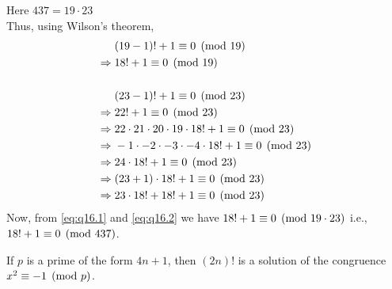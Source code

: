 \documentclass[12pt]{book}
\begin{document}
\begin{soln}
    Here $ 437=19\cdot 23 $\\
    Thus, using Wilson's theorem,
    \begin{align}
        &(19-1)!+1\equiv 0\pmod{19}\notag\\
        \Rightarrow\;&18!+1\equiv 0 \pmod{19}\label{eq:q16.1}\\
        &\notag\\
        &(23-1)!+1\equiv 0 \pmod{23}\notag\\
        \Rightarrow\;&22!+1\equiv 0 \pmod{23}\notag\\
        \Rightarrow\;&22\cdot21\cdot20\cdot19\cdot18!+1\equiv 0 \pmod{23}\notag\\
        \Rightarrow\;&-1\cdot -2\cdot -3\cdot -4\cdot 18!+1\equiv 0 \pmod{23}\notag\\
        \Rightarrow\;&24\cdot 18!+1\equiv 0 \pmod{23}\notag\\
        \Rightarrow\;&(23+1)\cdot 18!+1\equiv 0 \pmod{23}\notag\\
        \Rightarrow\;&23\cdot18! +18!+1\equiv 0 \pmod{23}\label{eq:q16.2}
    \end{align}
    Now, from \eqref{eq:q16.1} and \eqref{eq:q16.2} we have $ 18!+1\equiv 0 \pmod{19\cdot23} $ i.e., $ 18!+1\equiv 0 \pmod{437} $.
\end{soln}
\begin{qn}
    If $ p $ is a prime of the form $ 4n+1 $, then $ (2n)! $ is a solution of the congruence $ x^2\equiv -1 \pmod{p} $.
\end{qn}
\end{document}

